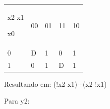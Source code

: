 \documentclass{article}
\begin{document}
\begin{table}[h]
 \centering
 {\renewcommand\arraystretch{1.25}
 \begin{tabular}{ l l l l l }
  \cline{1-1}\cline{2-2}\cline{3-3}\cline{4-4}\cline{5-5}  
    \multicolumn{1}{|p{1.300cm}|}{\begin{center}x2 x1
\end{center}  			


\begin{center}x0
\end{center}} &
    \multicolumn{1}{p{0.700cm}|}{00 \centering } &
    \multicolumn{1}{p{0.700cm}|}{01 \centering } &
    \multicolumn{1}{p{0.700cm}|}{11 \centering } &
    \multicolumn{1}{p{0.650cm}|}{10 \centering }
  \\  
  \cline{1-1}\cline{2-2}\cline{3-3}\cline{4-4}\cline{5-5}  
    \multicolumn{1}{|p{1.300cm}|}{0 \centering } &
    \multicolumn{1}{p{0.700cm}|}{D \centering } &
    \multicolumn{1}{p{0.700cm}|}{1 \centering } &
    \multicolumn{1}{p{0.700cm}|}{0 \centering } &
    \multicolumn{1}{p{0.650cm}|}{1 \centering }
  \\  
  \cline{1-1}\cline{2-2}\cline{3-3}\cline{4-4}\cline{5-5}  
    \multicolumn{1}{|p{1.300cm}|}{1 \centering } &
    \multicolumn{1}{p{0.700cm}|}{0 \centering } &
    \multicolumn{1}{p{0.700cm}|}{1 \centering } &
    \multicolumn{1}{p{0.700cm}|}{D \centering } &
    \multicolumn{1}{p{0.650cm}|}{1 \centering }
  \\  
  \hline

 \end{tabular} }
\end{table}

Resultando em: (!x2 x1)+(x2 !x1)

Para y2:
\end{document}
